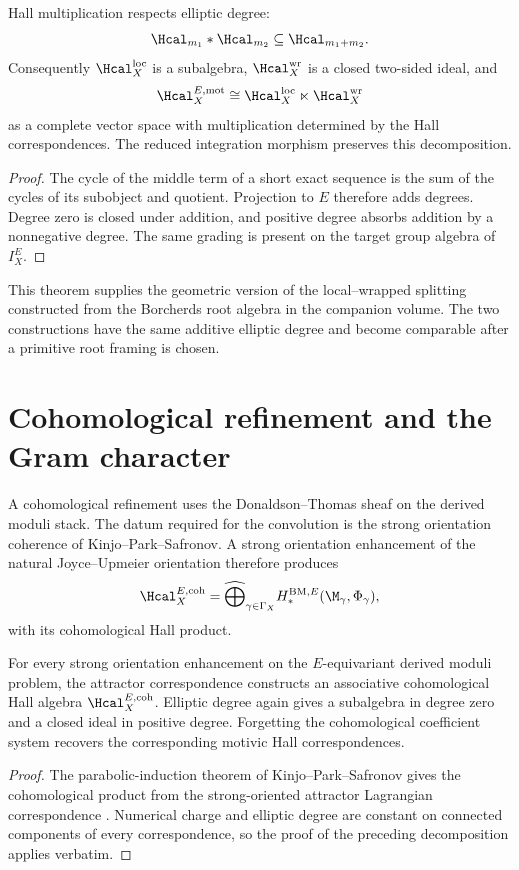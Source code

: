 \begin{theorem}
Hall multiplication respects elliptic degree:
\[
 \Hcal_{m_1}*\Hcal_{m_2}\subseteq\Hcal_{m_1+m_2}.
\]
Consequently $\Hcal_X^{\mathrm{loc}}$ is a subalgebra, $\Hcal_X^{\mathrm{wr}}$ is a closed two-sided ideal, and
\[
 \Hcal_X^{E,\mathrm{mot}}
 \cong
 \Hcal_X^{\mathrm{loc}}\ltimes\Hcal_X^{\mathrm{wr}}
\]
as a complete vector space with multiplication determined by the Hall correspondences.  The reduced integration morphism preserves this decomposition.
\end{theorem}
\begin{proof}
The cycle of the middle term of a short exact sequence is the sum of the cycles of its subobject and quotient.  Projection to $E$ therefore adds degrees.  Degree zero is closed under addition, and positive degree absorbs addition by a nonnegative degree.  The same grading is present on the target group algebra of $I_X^E$.
\end{proof}

This theorem supplies the geometric version of the local--wrapped splitting constructed from the Borcherds root algebra in the companion volume.  The two constructions have the same additive elliptic degree and become comparable after a primitive root framing is chosen.

\chapter{Cohomological refinement and the Gram character}
A cohomological refinement uses the Donaldson--Thomas sheaf on the derived moduli stack.  The datum required for the convolution is the strong orientation coherence of Kinjo--Park--Safronov.  A strong orientation enhancement of the natural Joyce--Upmeier orientation therefore produces
\[
 \Hcal_X^{E,\mathrm{coh}}
 =\widehat\bigoplus_{\gamma\in\Gamma_X}
 H_*^{\mathrm{BM},E}(\M_\gamma,\Phi_\gamma),
\]
with its cohomological Hall product.

\begin{theorem}
For every strong orientation enhancement on the $E$-equivariant derived moduli problem, the attractor correspondence constructs an associative cohomological Hall algebra $\Hcal_X^{E,\mathrm{coh}}$.  Elliptic degree again gives a subalgebra in degree zero and a closed ideal in positive degree.  Forgetting the cohomological coefficient system recovers the corresponding motivic Hall correspondences.
\end{theorem}
\begin{proof}
The parabolic-induction theorem of Kinjo--Park--Safronov gives the cohomological product from the strong-oriented attractor Lagrangian correspondence \cite{KPS}.  Numerical charge and elliptic degree are constant on connected components of every correspondence, so the proof of the preceding decomposition applies verbatim.
\end{proof}

